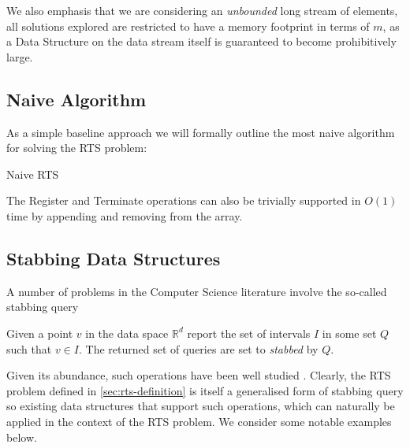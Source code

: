 We also emphasis that we are considering an \textit{unbounded} long stream of elements, all solutions explored are restricted to have a memory footprint in terms of $m$, as a Data Structure on the data stream itself is guaranteed to become prohibitively large.

\subsection{Naive Algorithm}
\label{sec:naive-algorithm}

As a simple baseline approach we will formally outline the most naive algorithm for solving the RTS problem:

\begin{algorithm}
\caption{Naive RTS}\label{alg:naive-rts}
\begin{algorithmic}[1]
\State {}
\State {}
\State {}
\EndFor
\EndFor
\EndProcedure
\end{algorithmic}
\end{algorithm}

The Register and Terminate operations can also be trivially supported in $O(1)$ time by appending and removing from the array. 

\subsection{Stabbing Data Structures}
\label{sec:stabbing-data-structs}

A number of problems in the Computer Science literature involve the so-called stabbing query

\begin{definition} Given a point $v$ in the data space $\mathbb{R}^d$ report the set of intervals $I$ in some set $Q$ such that $v \in I$. The returned set of queries are set to \textit{stabbed} by $Q$.
\end{definition}

Given its abundance, such operations have been well studied \cite{DBLP:conf/soda/Rahul15}.  Clearly, the RTS problem defined in \cref{sec:rts-definition} is itself a generalised form of stabbing query so existing data structures that support such operations, which can naturally be applied in the context of the RTS problem. We consider some notable examples below. 

